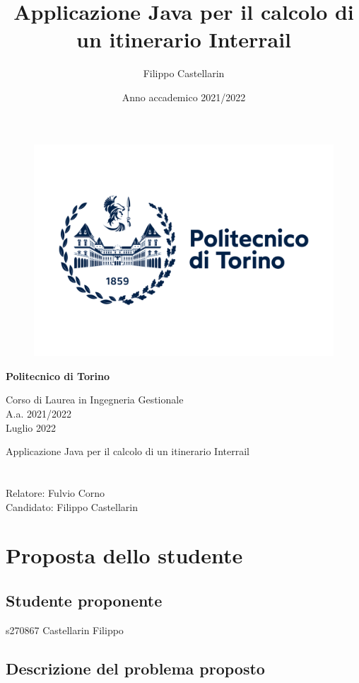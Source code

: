 \documentclass[12pt, a4paper]{article}
\begin{document}
	\author{Filippo Castellarin} 
	\title{Applicazione Java per il calcolo di un itinerario Interrail}
	\date{Anno accademico 2021/2022}
	\begin{figure}[h]
		\centering
		\includegraphics[width=0.7\linewidth]{polito_logo_2021_blu}
	\end{figure}
	
	\begin{center}
		\LARGE{\textbf{Politecnico di Torino}}
	\end{center}
\begin{center}
		\Large{Corso di Laurea in Ingegneria Gestionale\\A.a. 2021/2022\\Luglio 2022}
	\end{center}
	
	\begin{center}
				\LARGE{Applicazione Java per il calcolo di un itinerario Interrail}
	\end{center}
\section*{ }
Relatore: Fulvio Corno\\
Candidato: Filippo Castellarin


\newpage
	\tableofcontents
	
	\newpage
	
	\section{Proposta dello studente}
	\subsection{ Studente proponente}
	s270867 Castellarin Filippo
	
	\subsection{ Descrizione del problema proposto}
	
\end{document}
